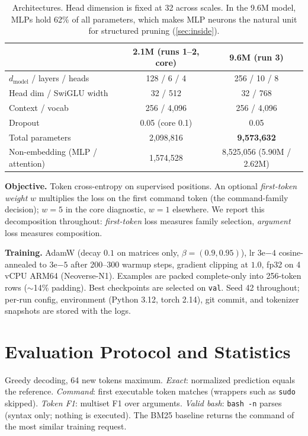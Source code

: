 \documentclass[11pt,a4paper]{article}
\newcommand{\best}[1]{\textbf{#1}}
\begin{document}
\begin{table}[t]
\centering\small
\begin{tabular}{lcc}
\toprule
 & 2.1M (runs 1--2, core) & 9.6M (run 3) \\
\midrule
$d_{\text{model}}$ / layers / heads & 128 / 6 / 4 & 256 / 10 / 8 \\
Head dim / SwiGLU width & 32 / 512 & 32 / 768 \\
Context / vocab & 256 / 4{,}096 & 256 / 4{,}096 \\
Dropout & 0.05 (core 0.1) & 0.05 \\
Total parameters & 2{,}098{,}816 & \best{9{,}573{,}632} \\
Non-embedding (MLP / attention) & 1{,}574{,}528 & 8{,}525{,}056 (5.90M / 2.62M) \\
\bottomrule
\end{tabular}
\caption{Architectures. Head dimension is fixed at 32 across scales. In the
9.6M model, MLPs hold 62\% of all parameters, which makes MLP neurons the
natural unit for structured pruning (\cref{sec:inside}).}
\label{tab:arch}
\end{table}

\textbf{Objective.} Token cross-entropy on supervised positions. An optional
\emph{first-token weight} $w$ multiplies the loss on the first command token
(the command-family decision); $w{=}5$ in the core diagnostic, $w{=}1$
elsewhere. We report this decomposition throughout: \emph{first-token} loss
measures family selection, \emph{argument} loss measures composition.

\textbf{Training.} AdamW \citep{loshchilov2019adamw} (decay $0.1$ on matrices
only, $\beta{=}(0.9,0.95)$), lr $3\mathrm{e}{-4}$ cosine-annealed to
$3\mathrm{e}{-5}$ after 200--300 warmup steps, gradient clipping at $1.0$,
fp32 on 4 vCPU ARM64 (Neoverse-N1). Examples are packed complete-only into
256-token rows ($\sim$14\% padding). Best checkpoints are selected on
\texttt{val}. Seed 42 throughout; per-run config, environment (Python 3.12,
torch 2.14), git commit, and tokenizer snapshots are stored with the logs.

\section{Evaluation Protocol and Statistics}
\label{sec:protocol}

Greedy decoding, 64 new tokens maximum. \emph{Exact}: normalized prediction
equals the reference. \emph{Command}: first executable token matches
(wrappers such as \texttt{sudo} skipped). \emph{Token F1}: multiset F1 over
arguments. \emph{Valid bash}: \texttt{bash -n} parses (syntax only; nothing
is executed). The BM25 baseline \citep{robertson2009bm25} returns the command
of the most similar training request.
\end{document}

